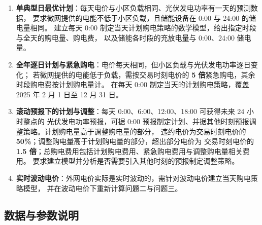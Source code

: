\documentclass[12pt,a4paper,fontset=fandol]{ctexart}
\begin{document}
\begin{enumerate}[label=\textbf{问题\arabic*.}, leftmargin=4em, itemsep=2pt]
\item \textbf{单典型日最优计划}\nobreak：每天电价与小区负载相同\nobreak、光伏发电功率有一天的预测数据\nobreak，
要求微网提供的电能不低于小区负载\nobreak，且储能设备在 0:00 与 24:00 的储电量相同\nobreak。
建立每天 0:00 制定当天计划购电策略的数学模型\nobreak，给出指定时段与全天的购电量\nobreak、购电费\nobreak，
以及储能各时段的充放电量与 0:00\nobreak、24:00 储电量\nobreak。
\item \textbf{全年逐日计划与紧急购电}\nobreak：电价每天相同\nobreak，但小区负载与光伏发电功率逐日变化\nobreak；
若微网提供的电能低于负载\nobreak，需按交易时刻电价的 \textbf{5 倍}紧急购电\nobreak，其余时段购电费按计划购电量计\nobreak。
在每天 0:00 制定当天的计划购电策略\nobreak，覆盖 2025 年 2 月 1 日至 12 月 31 日\nobreak。
\item \textbf{滚动预报下的计划与调整}\nobreak：每天 0:00\nobreak、6:00\nobreak、12:00\nobreak、18:00 可获得未来 24 小时整点的
光伏发电功率预报\nobreak，可据 0:00 预报制定计划\nobreak、并据其他时刻预报调整策略\nobreak。计划购电量高于调整购电量的部分\nobreak，
违约电价为交易时刻电价的 \textbf{50\%}\nobreak；调整购电量高于计划购电量的部分\nobreak，超出部分电价为
交易时刻电价的 \textbf{1.5 倍}\nobreak；总购电费用包括计划购电费用\nobreak、紧急购电费用与调整购电量相关费用\nobreak。
要求建立模型并分析是否需要引入其他时刻的预报制定调整策略\nobreak。
\item \textbf{实时波动电价}\nobreak：外网电价实际是实时波动的\nobreak，需针对波动电价建立当天购电策略模型\nobreak，
并在波动电价下重新计算问题二与问题三\nobreak。
\end{enumerate}

\subsection{数据与参数说明}
\end{document}
